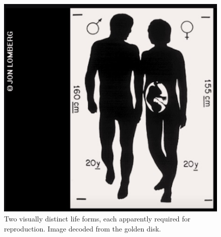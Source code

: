 


\begin{figure}
\includegraphics[width=1\columnwidth]{parents_voyager.jpg}
\caption{Two visually distinct life forms, each apparently required for reproduction. Image decoded from the golden disk.
\label{fig:1}}
\end{figure}

